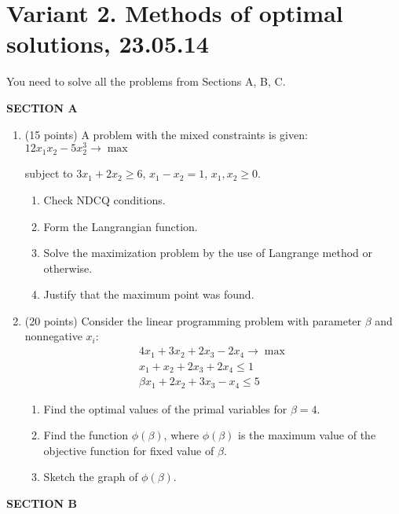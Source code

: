 \documentclass[12pt,a4paper]{article}
\begin{document}
\newpage


\section*{Variant 2. Methods of optimal solutions, 23.05.14}

You need to solve all the problems from Sections A, B, C.

\pagestyle{empty}

\textbf{SECTION A}

\begin{enumerate}
\item (15 points) A problem with the mixed constraints is given: $12x_1 x_2-5x_2^3 \to \max$

subject to $3x_1+2x_2 \geq 6$, $x_1-x_2=1$, $x_1, x_2 \geq 0$.
\begin{enumerate}
\item Check NDCQ conditions.
\item  Form the Langrangian function.
\item Solve the maximization problem by the use of Langrange method or otherwise.
\item Justify that the maximum point was found.
\end{enumerate}
\item  (20 points)   Consider the linear programming problem with parameter $\beta$ and nonnegative $x_i$:
\begin{align*}
4x_1+3x_2+2x_3-2x_4 \to \max \\
x_1+x_2+2x_3+2x_4\leq 1 \\
\beta x_1+2x_2+3x_3-x_4 \leq 5
\end{align*}

\begin{enumerate}
\item Find the optimal values of the primal variables for $\beta=4$.
\item Find the function $\phi(\beta)$, where $\phi(\beta)$  is the maximum value of the objective function for fixed value of $\beta$.
\item Sketch the graph of $\phi(\beta)$.
\end{enumerate}


\end{enumerate}

\textbf{SECTION B}
\end{document}
